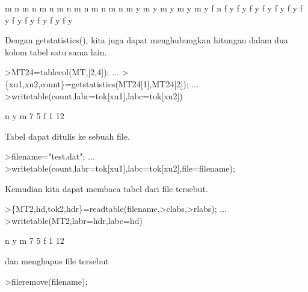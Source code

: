 \documentclass[12pt,arial,letterpaper]{book}
\begin{document}
\begin{eulernootebook}
\begin{eulercomment}
\begin{eulercomment}
\begin{eulernootebook}
\begin{eulercomment}
\begin{eulercomment}
\begin{eulercomment}
\begin{eulercomment}
\begin{eulercomment}
\begin{eulercomment}
\begin{eulercomment}
\begin{euleroutput}
           m         n
           m         n
           m         n
           m         n
           m         n
           m         n
           m         n
           m         y
           m         y
           m         y
           m         y
           m         y
           f         n
           f         y
           f         y
           f         y
           f         y
           f         y
           f         y
           f         y
           f         y
           f         y
           f         y
           f         y
           f         y
\end{euleroutput}
\begin{eulercomment}
Dengan getstatistics(), kita juga dapat menghubungkan hitungan dalam
dua kolom tabel satu sama lain.
\end{eulercomment}
\begin{eulerprompt}
>MT24=tablecol(MT,[2,4]); ...
>\{xu1,xu2,count\}=getstatistics(MT24[1],MT24[2]); ...
>writetable(count,labr=tok[xu1],labc=tok[xu2])
\end{eulerprompt}
\begin{euleroutput}
                     n         y
           m         7         5
           f         1        12
\end{euleroutput}
\begin{eulercomment}
Tabel dapat ditulis ke sebuah file.
\end{eulercomment}
\begin{eulerprompt}
>filename="test.dat"; ...
>writetable(count,labr=tok[xu1],labc=tok[xu2],file=filename);
\end{eulerprompt}
\begin{eulercomment}
Kemudian kita dapat membaca tabel dari file tersebut.
\end{eulercomment}
\begin{eulerprompt}
>\{MT2,hd,tok2,hdr\}=readtable(filename,>clabs,>rlabs); ...
>writetable(MT2,labr=hdr,labc=hd)
\end{eulerprompt}
\begin{euleroutput}
                     n         y
           m         7         5
           f         1        12
\end{euleroutput}
\begin{eulercomment}
dan menghapus file tersebut
\end{eulercomment}
\begin{eulerprompt}
>fileremove(filename);
\end{eulerprompt}

\end{eulercomment}
\end{eulercomment}
\end{eulercomment}
\end{eulercomment}
\end{eulercomment}
\end{eulercomment}
\end{eulercomment}
\end{eulernootebook}
\end{eulercomment}
\end{eulercomment}
\end{eulernootebook}
\end{document}

